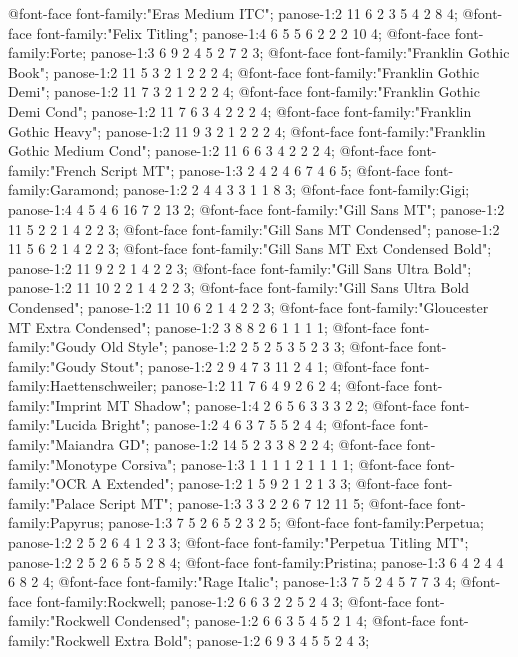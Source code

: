 @font-face
	{font-family:"Eras Medium ITC";
	panose-1:2 11 6 2 3 5 4 2 8 4;}
@font-face
	{font-family:"Felix Titling";
	panose-1:4 6 5 5 6 2 2 2 10 4;}
@font-face
	{font-family:Forte;
	panose-1:3 6 9 2 4 5 2 7 2 3;}
@font-face
	{font-family:"Franklin Gothic Book";
	panose-1:2 11 5 3 2 1 2 2 2 4;}
@font-face
	{font-family:"Franklin Gothic Demi";
	panose-1:2 11 7 3 2 1 2 2 2 4;}
@font-face
	{font-family:"Franklin Gothic Demi Cond";
	panose-1:2 11 7 6 3 4 2 2 2 4;}
@font-face
	{font-family:"Franklin Gothic Heavy";
	panose-1:2 11 9 3 2 1 2 2 2 4;}
@font-face
	{font-family:"Franklin Gothic Medium Cond";
	panose-1:2 11 6 6 3 4 2 2 2 4;}
@font-face
	{font-family:"French Script MT";
	panose-1:3 2 4 2 4 6 7 4 6 5;}
@font-face
	{font-family:Garamond;
	panose-1:2 2 4 4 3 3 1 1 8 3;}
@font-face
	{font-family:Gigi;
	panose-1:4 4 5 4 6 16 7 2 13 2;}
@font-face
	{font-family:"Gill Sans MT";
	panose-1:2 11 5 2 2 1 4 2 2 3;}
@font-face
	{font-family:"Gill Sans MT Condensed";
	panose-1:2 11 5 6 2 1 4 2 2 3;}
@font-face
	{font-family:"Gill Sans MT Ext Condensed Bold";
	panose-1:2 11 9 2 2 1 4 2 2 3;}
@font-face
	{font-family:"Gill Sans Ultra Bold";
	panose-1:2 11 10 2 2 1 4 2 2 3;}
@font-face
	{font-family:"Gill Sans Ultra Bold Condensed";
	panose-1:2 11 10 6 2 1 4 2 2 3;}
@font-face
	{font-family:"Gloucester MT Extra Condensed";
	panose-1:2 3 8 8 2 6 1 1 1 1;}
@font-face
	{font-family:"Goudy Old Style";
	panose-1:2 2 5 2 5 3 5 2 3 3;}
@font-face
	{font-family:"Goudy Stout";
	panose-1:2 2 9 4 7 3 11 2 4 1;}
@font-face
	{font-family:Haettenschweiler;
	panose-1:2 11 7 6 4 9 2 6 2 4;}
@font-face
	{font-family:"Imprint MT Shadow";
	panose-1:4 2 6 5 6 3 3 3 2 2;}
@font-face
	{font-family:"Lucida Bright";
	panose-1:2 4 6 3 7 5 5 2 4 4;}
@font-face
	{font-family:"Maiandra GD";
	panose-1:2 14 5 2 3 3 8 2 2 4;}
@font-face
	{font-family:"Monotype Corsiva";
	panose-1:3 1 1 1 1 2 1 1 1 1;}
@font-face
	{font-family:"OCR A Extended";
	panose-1:2 1 5 9 2 1 2 1 3 3;}
@font-face
	{font-family:"Palace Script MT";
	panose-1:3 3 3 2 2 6 7 12 11 5;}
@font-face
	{font-family:Papyrus;
	panose-1:3 7 5 2 6 5 2 3 2 5;}
@font-face
	{font-family:Perpetua;
	panose-1:2 2 5 2 6 4 1 2 3 3;}
@font-face
	{font-family:"Perpetua Titling MT";
	panose-1:2 2 5 2 6 5 5 2 8 4;}
@font-face
	{font-family:Pristina;
	panose-1:3 6 4 2 4 4 6 8 2 4;}
@font-face
	{font-family:"Rage Italic";
	panose-1:3 7 5 2 4 5 7 7 3 4;}
@font-face
	{font-family:Rockwell;
	panose-1:2 6 6 3 2 2 5 2 4 3;}
@font-face
	{font-family:"Rockwell Condensed";
	panose-1:2 6 6 3 5 4 5 2 1 4;}
@font-face
	{font-family:"Rockwell Extra Bold";
	panose-1:2 6 9 3 4 5 5 2 4 3;}
